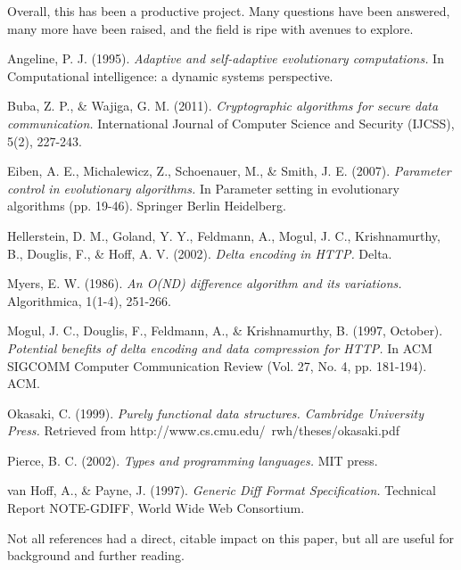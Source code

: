 \documentclass[12pt,a4paper]{article}
\begin{document}
		Overall, this has been a productive project. Many questions have been answered, many more have been raised, and the field is ripe with avenues to explore.
	
	
	\begin{thebibliography}{9}
		
		Angeline, P. J. (1995). 
		\textit{Adaptive and self-adaptive evolutionary computations.} 
		In Computational intelligence: a dynamic systems perspective.
		
		Buba, Z. P., \& Wajiga, G. M. (2011). 
		\textit{Cryptographic algorithms for secure data communication.} 
		International Journal of Computer Science and Security (IJCSS), 5(2), 227-243.
		
		Eiben, A. E., Michalewicz, Z., Schoenauer, M., \& Smith, J. E. (2007). 
		\textit{Parameter control in evolutionary algorithms.} 
		In Parameter setting in evolutionary algorithms (pp. 19-46). Springer Berlin Heidelberg.
		
		Hellerstein, D. M., Goland, Y. Y., Feldmann, A., Mogul, J. C., Krishnamurthy, B., Douglis, F., \& Hoff, A. V. (2002). 
		\textit{Delta encoding in HTTP.} 
		Delta.
		
		Myers, E. W. (1986). 
		\textit{An O(ND) difference algorithm and its variations. }
		Algorithmica, 1(1-4), 251-266.
		
		Mogul, J. C., Douglis, F., Feldmann, A., \& Krishnamurthy, B. (1997, October). 
		\textit{Potential benefits of delta encoding and data compression for HTTP.}
		In ACM SIGCOMM Computer Communication Review (Vol. 27, No. 4, pp. 181-194). ACM.
				
		Okasaki, C. (1999). 
		\textit{Purely functional data structures. Cambridge University Press.}
		Retrieved from http://www.cs.cmu.edu/~rwh/theses/okasaki.pdf
		
		Pierce, B. C. (2002). 
		\textit{Types and programming languages.} 
		MIT press.
		
		van Hoff, A., \& Payne, J. (1997). 
		\textit{Generic Diff Format Specification.}
		Technical Report NOTE-GDIFF, World Wide Web Consortium.
		
	\end{thebibliography}
	
	Not all references had a direct, citable impact on this paper, but all are useful for background and further reading.
	
\end{document}
